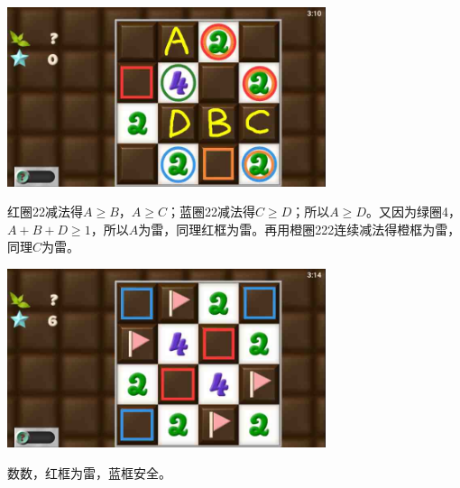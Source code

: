 \subsection{} %
\begin{center}
    \includegraphics[width=0.7\textwidth]{puzzlelow/52-1.jpg}
\end{center}
红圈22减法得$A\ge B$，$A\ge C$；蓝圈22减法得$C\ge D$；所以$A\ge D$。又因为绿圈4，$A+B+D\ge 1$，所以$A$为雷，同理红框为雷。再用橙圈222连续减法得橙框为雷，同理$C$为雷。
\begin{center}
    \includegraphics[width=0.7\textwidth]{puzzlelow/52-2.jpg}
\end{center}
数数，红框为雷，蓝框安全。

